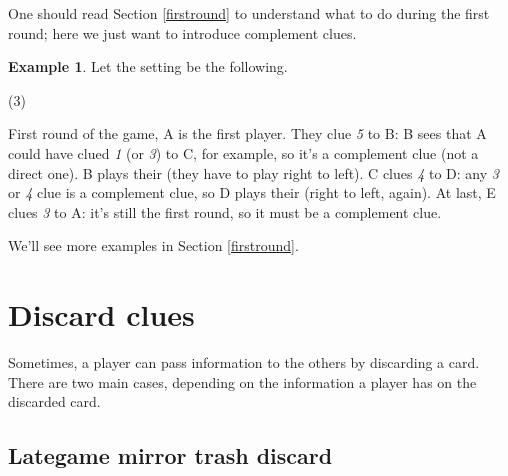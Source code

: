 \documentclass[a4paper]{article}
\theoremstyle{plain}
\theoremstyle{definition}
\newtheorem{example}[theorem]{Example}
\begin{document}
One should read Section \ref{firstround} to understand what to do during the first round; here we just want to introduce complement clues.

\begin{example}
	
	Let the setting be the following.
	
	\begin{tasks}(3)
		\task[+]      
		\task[A]    
		\task[B]    
		\task[C]    
		\task[D]    
		\task[E]    
	\end{tasks}
	
	First round of the game, A is the first player. They clue \textit{5} to B: B sees that A could have clued \textit{1} (or \textit{3}) to C, for example, so it's a complement clue (not a direct one). B plays their  (they have to play right to left). C clues \textit{4} to D: any \textit{3} or \textit{4} clue is a complement clue, so D plays their  (right to left, again). At last, E clues \textit{3} to A: it's still the first round, so it must be a complement clue.
\end{example}

We'll see more examples in Section \ref{firstround}.

\section{Discard clues}

Sometimes, a player can pass information to the others by discarding a card. There are two main cases, depending on the information a player has on the discarded card.

%
%

\subsection{Lategame mirror trash discard}
\end{document}
